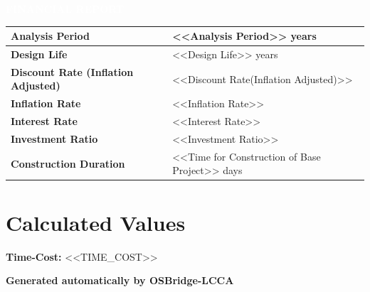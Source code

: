 \documentclass[12pt]{article}
\begin{document}
\vspace*{2.2cm}

\noindent
\colorbox{osgreen}{\parbox{\dimexpr\linewidth-2\fboxsep}{
    \centering
    \textcolor{white}{\textbf{FINANCIAL REPORT}}
}}

\vspace{1cm}

\begin{tabularx}{\linewidth}{|l|X|}
\hline
\textbf{Analysis Period} & <<Analysis Period>> years \\ \hline
\textbf{Design Life} & <<Design Life>> years \\ \hline
\textbf{Discount Rate (Inflation Adjusted)} & <<Discount Rate(Inflation Adjusted)>> \\ \hline
\textbf{Inflation Rate} & <<Inflation Rate>> \\ \hline
\textbf{Interest Rate} & <<Interest Rate>> \\ \hline
\textbf{Investment Ratio} & <<Investment Ratio>> \\ \hline
\textbf{Construction Duration} & <<Time for Construction of Base Project>> days \\ \hline
\end{tabularx}

\vspace{1cm}

\section*{Calculated Values}
\textbf{Time-Cost:} <<TIME_COST>>

\vspace{2cm}
\textbf{Generated automatically by OSBridge-LCCA}
\end{document}
